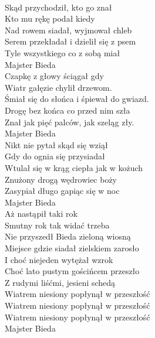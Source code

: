 
\begin{flushleft}
\tab{}\tab{} \\
Skąd przychodził, kto go znał  \tab{}\tab{}  \\
Kto mu rękę podał kiedy \tab{}\tab{} \\
Nad rowem siadał, wyjmował chleb \tab{} \\
Serem przekładał i dzielił się z psem \tab{} \\
Tyle wszystkiego co z sobą miał  \tab{} \\
Majster Bieda \\
\vskip 3mm
Czapkę z głowy ściągał gdy \\
Wiatr gałęzie chylił drzewom. \\
Śmiał się do słońca i śpiewał do gwiazd. \\
Drogę bez końca co przed nim szła \\
Znał jak pięć palców, jak szeląg zły. \\
Majster Bieda \\
\vskip 3mm
Nikt nie pytał skąd się wziął \\
Gdy do ognia się przysiadał \\
Wtulał się w krąg ciepła jak w kożuch \\
Znużony drogą wędrowiec boży \\
Zasypiał długo gapiąc się w noc \\
Majster Bieda \\
\vskip 3mm
Aż nastąpił taki rok \\
Smutny rok tak widać trzeba \\
Nie przyszedł Bieda zieloną wiosną \\
Miejsce gdzie siadał zielskiem zarosło \\
I choć niejeden wytężał wzrok \\
Choć lato pustym gościńcem przeszło \\
Z rudymi liśćmi, jesieni schedą \\
Wiatrem niesiony popłynął w przeszłość \\
Wiatrem niesiony popłynął w przeszłość \\
Wiatrem niesiony popłynął w przeszłość \\
Majster Bieda \\
\end{flushleft}
\clearpage
